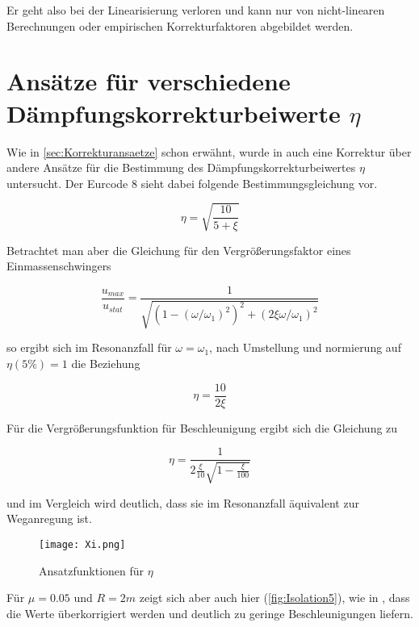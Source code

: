 Er geht also bei der Linearisierung verloren und kann nur von nicht-linearen Berechnungen oder empirischen Korrekturfaktoren abgebildet werden.

\pagebreak

\section{Ansätze für verschiedene Dämpfungskorrekturbeiwerte $\eta$}

Wie in \cref{sec:Korrekturansaetze} schon erwähnt, wurde in \cite{Isemann} auch eine Korrektur über andere Ansätze für die Bestimmung des Dämpfungskorrekturbeiwertes $\eta$ untersucht.
Der Eurcode 8 sieht dabei folgende Bestimmungsgleichung vor.

\begin{equation*}
\eta = \sqrt{\frac{10}{5+\xi}}
\end{equation*}

Betrachtet man aber die Gleichung für den Vergrößerungsfaktor eines Einmassenschwingers

\begin{equation}
\frac{u_{max}}{u_{stat}} = \frac{1}{\sqrt{(1 - (\omega / \omega_1)^2)^2 + (2 \xi \omega / \omega_1)^2}}
\end{equation}

so ergibt sich im Resonanzfall für $\omega = \omega_1$, nach Umstellung und normierung auf $\eta(5 \%) = 1$ die Beziehung

\begin{equation}
\eta = \frac{10}{2\xi}
\end{equation}

\pagebreak

Für die Vergrößerungsfunktion für Beschleunigung ergibt sich die Gleichung zu 

\begin{equation}
\eta = \frac{1}{2\frac{\xi}{10}\sqrt{1-\frac{\xi}{100}}}
\end{equation}

und im Vergleich wird deutlich, dass sie im Resonanzfall äquivalent zur Weganregung ist.

\begin{figure}[H]
    \centering
    \texttt{[image: Xi.png]}
    \caption{Ansatzfunktionen für $\eta$}
    \label{fig:eta}
\end{figure}

Für $\mu = 0.05$ und $R = 2 m$ zeigt sich aber auch hier (\cref{fig:Isolation5}), wie in \cite{Isemann}, dass die Werte überkorrigiert werden und deutlich zu geringe Beschleunigungen liefern.

